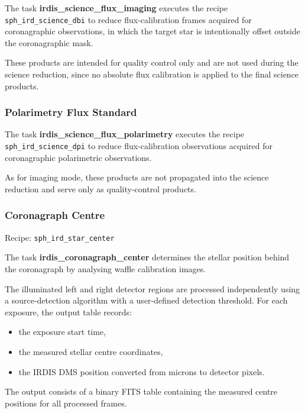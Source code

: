 The task \textbf{irdis\_science\_flux\_imaging} executes the recipe \texttt{sph\_ird\_science\_dbi} to reduce flux-calibration frames acquired for coronagraphic observations, in which the target star is intentionally offset outside the coronagraphic mask.

These products are intended for quality control only and are not used during the science reduction, since no absolute flux calibration is applied to the final science products.

\subsubsection{Polarimetry Flux Standard}

The task \textbf{irdis\_science\_flux\_polarimetry} executes the recipe \texttt{sph\_ird\_science\_dpi} to reduce flux-calibration observations acquired for coronagraphic polarimetric observations.

As for imaging mode, these products are not propagated into the science reduction and serve only as quality-control products.

\subsubsection{Coronagraph Centre}

Recipe: \texttt{sph\_ird\_star\_center}

The task \textbf{irdis\_coronagraph\_center} determines the stellar position
behind the coronagraph by analysing waffle calibration images.

The illuminated left and right detector regions are processed independently
using a source-detection algorithm with a user-defined detection threshold.
For each exposure, the output table records:

\begin{itemize}
    \item the exposure start time,
    \item the measured stellar centre coordinates,
    \item the IRDIS DMS position converted from microns to detector pixels.
\end{itemize}

The output consists of a binary FITS table containing the measured centre
positions for all processed frames.

